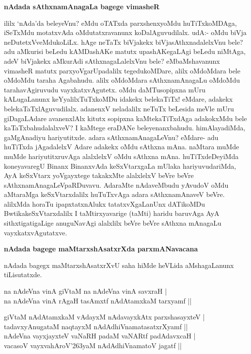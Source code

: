 {\bigskip
\noindent
{\large\bf nAdada sAthxnamAnagaLa bagege vimasheR}}\label{page158b}
\medskip

\noindent
ililx `nAda'da beleyeVnu? eMdu oTATxda parxshenxyoMdu huTiTxkoMDAga, iSeTxMdu motatxvAda oMdutatxravanunx koDalAguvudilalx. udA:- oMdu biVja neDutetxVveMdukoLiLx. hAge neTaTx biVjakekx biVjasAthxnadalelxVnu bele? adu aMkurisi beLedu kAMDashAKe matutx upashAKegaLAgi beLedu niMtAga, adeV biVjakekx aMkurAdi sAthxnagaLalelxVnu bele? eMbaMshavanunx vimasheR matutx parxyoVgarUpadalilx tegedukoMDare, alilx oMdoMdara bele oMdoMdu taraha Agabahudu. alilx oMdoMdara sAthxnamAnagaLu oMdoMdu tarahavAgiruvudu vayxkatxvAgutetx. oMdu daMTusopipxna mUru kALugaLanunx keYyalilxTuTxkoMDu idakekx belekaTiTx! eMdare, adakekx belekaTaTxlAguvudilalx. adanenxV neladalilx neTuTx beLesida meVle mUru giDagaLAdare avanenxlAlx kitutx sopipxna kaMtekaTiTxdAga adakokxMdu bele kaTaTxbahudalalxveV? I kaMtege eraDANe beleyenanxbahudu. himAlayadiMda, gaMgAnadiyu hariyutitxde. adara sAthxnamAnagaLeVnu? eMdare- adu huTiTxda jAgadalelxV Adare adakekx oMdu sAthxna mAna. naMtara muMde muMde hariyutitxruvAga alalxlelxV oMdu sAthxna mAna. huTiTxdeDeyiMda koneyavaregU Binanx BinanxvAda keSxVtarxgaLa mUlaka hariyuvudariMda, AyA keSxVtarx yoVgayxtege takakxMte alalxlelxV beVre beVre sAthxnamAnagaLeVpaRDuvavu. AdaraMte nAdaveMbudu yAvudoV oMdu aMtaraMga keSxVtarxdalilx huTuTxvAga adara sAthxnamAnaveV beVre. alilxMda horaTu ipapxtatxnAlukx tatatxvXgaLanUnx dATikoMDu BwtikakeSxVtarxdalilx I taMtirxyavarige (taMti) haridu baruvAga AyA sithxtigatigaLige anuguNavAgi alalxlilx beVre beVre sAthxna mAnagaLu vayxkatxvAgutatxve.

{\bigskip
\noindent
{\large\bf nAdada bagege maMtarxshAsatxrXda parxmANavacana}}\label{page159}
\medskip

\noindent
nAdada bagegx maMtarxshAsatxrXvU saha hiMde heVLida aMshagaLanunx tiLisutatxde.

\begin{shloka}
na nAdeVna vinA giVtaM na nAdeVna vinA savxraH |\\\label{159}
na nAdeVna vinA rAgaH tasAmxtf nAdAtamxkaM tarxyamf ||
\end{shloka}

\begin{shloka}
giVtaM nAdAtamxkaM vAdayxM nAdavayxkAtx parxshasayxteV |\\\label{159a}
tadavxyAnugataM naqtayxM nAdAdhiVnamatasatxrXyamf ||\\
nAdeVna vayxjayxteV vaNaRH padaM vaNARtf padAdavxcaH |\\
vacasoV vayxvahAroV\char'263yaM nAdAdhiVnamatoV jagatf ||
\end{shloka}

